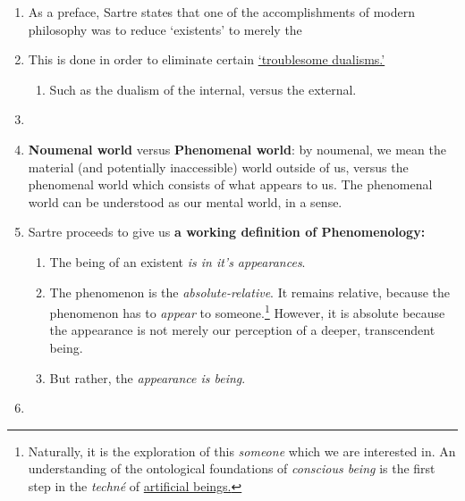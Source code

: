 \begin{enumerate}
  \item As a preface, Sartre states that one of the accomplishments of modern philosophy was to reduce \enquote*{existents} to merely the 
  \item This is done in order to eliminate certain \href{https://plato.stanford.edu/entries/dualism/#ProForDua}{\enquote*{troublesome dualisms.}}
  \begin{enumerate}
    \item Such as the dualism of the internal, versus the external.
  \end{enumerate}
  \item {}
  \item \textbf{Noumenal world} versus \textbf{Phenomenal world}:
  by noumenal, we mean the material (and potentially inaccessible) world outside of us, versus the phenomenal world which consists of what appears to us. The phenomenal world can be understood as our mental world, in a sense.
  \item Sartre proceeds to give us \textbf{a working definition of Phenomenology:}
  \begin{enumerate}
    \item The being of an existent \emph{is in it's appearances}. 
    \item The phenomenon is the \emph{absolute-relative}. It remains relative, because the phenomenon has to \emph{appear} to someone.\footnote{Naturally, it is the exploration of this \emph{someone} which we are interested in. An understanding of the ontological foundations of \emph{conscious being} is the first step in the \emph{techné} of \href{https://plato.stanford.edu/entries/artificial-intelligence/}{artificial beings.}} However, it is absolute because the appearance is not merely our perception of a deeper, transcendent being.
    \item But rather, the \emph{appearance is being}.
  \end{enumerate}
  \item {}

\end{enumerate}
